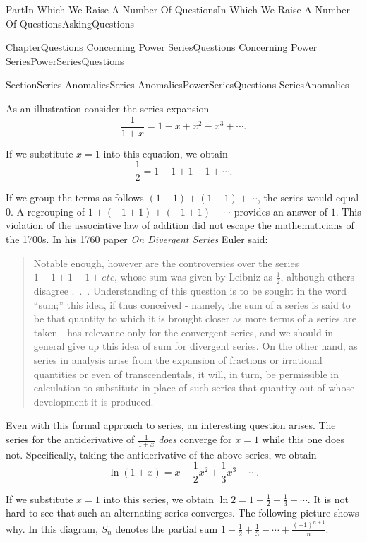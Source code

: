\documentclass[oneside,10pt,]{book}
\newcommand{\pubtitle}[1]{\textsl{#1}}
\numberwithin{equation}{part}
\begin{document}
\begin{partptx}{Part}{In Which We Raise A Number Of Questions}{}{In Which We Raise A Number Of Questions}{}{}{AskingQuestions}
\begin{chapterptx}{Chapter}{Questions Concerning Power Series}{}{Questions Concerning Power Series}{}{}{PowerSeriesQuestions}
\begin{sectionptx}{Section}{Series Anomalies}{}{Series Anomalies}{}{}{PowerSeriesQuestions-SeriesAnomalies}
\par
As an illustration consider the series expansion%
\begin{equation*}
\frac{1}{1+x}=1-x+x^2-x^3+\cdots\text{.}
\end{equation*}
%
\par
If we substitute \(x=1\) into this equation, we obtain%
\begin{equation*}
\frac{1}{2}=1-1+1-1+\cdots\text{.}
\end{equation*}
%
\par
If we group the terms as follows \((1-1)+(1-1)+\cdots\), the series would equal \(0\). A regrouping of \(1+(-1+1)+(-1+1)+\cdots\) provides an answer of \(1\). This violation of the associative law of addition did not escape the mathematicians of the 1700s. In his 1760 paper \pubtitle{On Divergent Series} Euler said:%
\begin{quote}%
Notable enough, however are the controversies over the series \(1-1+1-1+etc\),  whose sum was given by Leibniz as \(\frac{1}{2}\), although others disagree .~.~. Understanding of this question is to be sought in the word ``sum;'' this idea, if thus conceived - namely, the sum of a series is said to be that quantity to which it is brought closer as more terms of a series are taken - has relevance only for the convergent series, and we should in general give up this idea of sum for divergent series. On the other hand, as series in analysis arise from the expansion of fractions or irrational quantities or even of transcendentals, it will, in turn, be permissible in calculation to substitute in place of such series that quantity out of whose development it is produced.%
\end{quote}
Even with this formal approach to series, an interesting question arises. The series for the antiderivative of \(\frac{1}{1+x}\) \emph{does} converge for \(x=1\) while this one does not. Specifically, taking the antiderivative of the above series, we obtain%
\begin{equation*}
\ln(1+x)=x-\frac{1}{2}x^2+\frac{1}{3}x^3-\cdots\text{.}
\end{equation*}
%
\par
If we substitute \(x=1\) into this series, we obtain \(\ln 2=1-\frac{1}{2}+\frac{1}{3}-\cdots\). It is not hard to see that such an alternating series converges. The following picture shows why. In this diagram, \(S_n\) denotes the partial sum \(1-\frac{1}{2}+\frac{1}{3}-\cdots+\frac{(-1)^{n+1}}{n}\).%
\begin{image}{0.05}{0.9}{0.05}{}%

\end{image}
\end{sectionptx}
\end{chapterptx}
\end{partptx}
\end{document}
